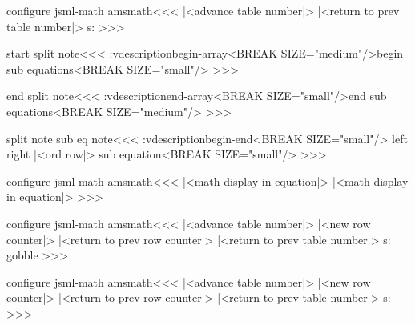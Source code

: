 {\<configure jsml-math amsmath\><<<
   {|<advance table number|>%
    }
   {\ifvmode\IgnorePar\fi 
    |<return to prev table number|>}
   {%
    \xdef\HRow:s{\HRow}%
   } 
   {}
   {%
   }
   {}
>>>


\<start split note\><<<
\add:vdescription{begin-array}{<BREAK SIZE="medium"/>begin 
    sub equations<BREAK SIZE="small"/>}%
>>>


\<end split note\><<<
\add:vdescription{end-array}{<BREAK SIZE="small"/>end sub equations<BREAK SIZE="medium"/>}%
>>>   

\<split note sub eq note\><<<
\add:vdescription{begin-end}{<BREAK SIZE="small"/>%
  \ifnum {} left \else right  \fi
  |<ord row|> sub equation<BREAK SIZE="small"/>}%
>>>

\<configure jsml-math amsmath\><<<
   {\bgroup |<math display in equation|>}
   {\egroup}
   {}{}  
   {\bgroup |<math display in equation|>}
   {\egroup}
   {}{}  
>>>

\<configure jsml-math amsmath\><<<
   {|<advance table number|>%
    |<new row counter|>%
    }
   {%
    |<return to prev row counter|>%
    |<return to prev table number|>}
   {}
   {\xdef\hrow:s{\HRow}} 
   {} 
   {}
   {\let\tagform@\:gobble}
   {}
>>>


\<configure jsml-math amsmath\><<<
   {|<advance table number|>%
    |<new row counter|>%
    }
   {\Tag{multline-\TableNo}{\hrow:s}%
    |<return to prev row counter|>%
    |<return to prev table number|>}
   {} 
   {\xdef\hrow:s{\HRow}} 
>>>





}

